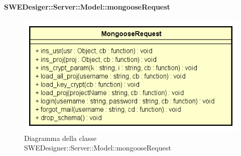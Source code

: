       \paragraph{SWEDesiger::Server::Model::mongooseRequest}
      	\begin{figure}[h!]
		\centering
		\includegraphics[scale=0.8]{Classi/MongooseRequest.png}
		\caption{Diagramma della classe SWEDesigner::Server::Model::mongooseRequest}
 		\end{figure}

